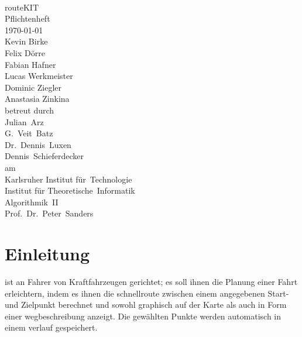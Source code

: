 \documentclass[a4paper, 11pt]{article}
\begin{document}
\begin{titlepage}
\makeatletter
\begin{center}
~\\[5em]
{\Huge routeKIT}\\[3em]
{\huge Pflichtenheft}\\[1em]
{\large\today}\\[2.5em]
{\LARGE
Kevin Birke\\
Felix Dörre\\
Fabian Hafner\\
Lucas Werkmeister\\
Dominic Ziegler\\
Anastasia Zinkina\\[3em]}
betreut durch\\[2em]
{\Large
Julian~Arz\\
G.~Veit~Batz\\
Dr.~Dennis~Luxen\\
Dennis~Schieferdecker\\[1em]}
am\\[1em]
{\Large
Karlsruher Institut für~Technologie\\
Institut für Theoretische~Informatik\\
Algorithmik~II\\
\large
Prof.~Dr.~Peter~Sanders\\}

\end{center}
\makeatother
\end{titlepage}
\newpage
\tableofcontents
\newpage

\section{Einleitung}
\routeKIT ist an Fahrer von Kraftfahrzeugen gerichtet; es soll ihnen die Planung einer Fahrt erleichtern, indem es ihnen die \gls{schnellroute} zwischen einem angegebenen Start- und Zielpunkt berechnet und sowohl graphisch auf der Karte als auch in Form einer \gls{wegbeschreibung} anzeigt. Die gewählten Punkte werden automatisch in einem \gls{verlauf} gespeichert.
\end{document}

